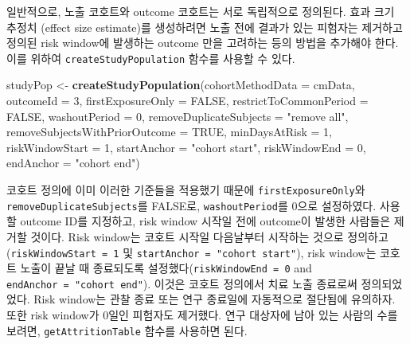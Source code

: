 \documentclass[11pt]{book}
\newenvironment{Shaded}{\begin{snugshade}}{\end{snugshade}}
\newcommand{\KeywordTok}[1]{\textcolor[rgb]{0.13,0.29,0.53}{\textbf{#1}}}
\newcommand{\DataTypeTok}[1]{\textcolor[rgb]{0.13,0.29,0.53}{#1}}
\newcommand{\DecValTok}[1]{\textcolor[rgb]{0.00,0.00,0.81}{#1}}
\newcommand{\StringTok}[1]{\textcolor[rgb]{0.31,0.60,0.02}{#1}}
\newcommand{\OtherTok}[1]{\textcolor[rgb]{0.56,0.35,0.01}{#1}}
\newcommand{\NormalTok}[1]{#1}
\theoremstyle{definition}
\theoremstyle{definition}
\theoremstyle{definition}
\theoremstyle{remark}
\begin{document}
일반적으로, 노출 코호트와 outcome 코호트는 서로 독립적으로 정의된다.
효과 크기 추정치 (effect size estimate)를 생성하려면 노출 전에 결과가
있는 피험자는 제거하고 정의된 risk window에 발생하는 outcome 만을
고려하는 등의 방법을 추가해야 한다. 이를 위하여
\texttt{createStudyPopulation} 함수를 사용할 수 있다.

\begin{Shaded}
\begin{Highlighting}[]
\NormalTok{studyPop <-}\StringTok{ }\KeywordTok{createStudyPopulation}\NormalTok{(}\DataTypeTok{cohortMethodData =}\NormalTok{ cmData,}
                                  \DataTypeTok{outcomeId =} \DecValTok{3}\NormalTok{,}
                                  \DataTypeTok{firstExposureOnly =} \OtherTok{FALSE}\NormalTok{,}
                                  \DataTypeTok{restrictToCommonPeriod =} \OtherTok{FALSE}\NormalTok{,}
                                  \DataTypeTok{washoutPeriod =} \DecValTok{0}\NormalTok{,}
                                  \DataTypeTok{removeDuplicateSubjects =} \StringTok{"remove all"}\NormalTok{,}
                                  \DataTypeTok{removeSubjectsWithPriorOutcome =} \OtherTok{TRUE}\NormalTok{,}
                                  \DataTypeTok{minDaysAtRisk =} \DecValTok{1}\NormalTok{,}
                                  \DataTypeTok{riskWindowStart =} \DecValTok{1}\NormalTok{,}
                                  \DataTypeTok{startAnchor =} \StringTok{"cohort start"}\NormalTok{,}
                                  \DataTypeTok{riskWindowEnd =} \DecValTok{0}\NormalTok{,}
                                  \DataTypeTok{endAnchor =} \StringTok{"cohort end"}\NormalTok{)}
\end{Highlighting}
\end{Shaded}

코호트 정의에 이미 이러한 기준들을 적용했기 때문에
\texttt{firstExposureOnly}와 \texttt{removeDuplicateSubjects}를 FALSE로,
\texttt{washoutPeriod}를 0으로 설정하였다. 사용할 outcome ID를 지정하고,
risk window 시작일 전에 outcome이 발생한 사람들은 제거할 것이다. Risk
window는 코호트 시작일 다음날부터 시작하는 것으로
정의하고(\texttt{riskWindowStart\ =\ 1} 및
\texttt{startAnchor\ =\ "cohort\ start"}), risk window는 코호트 노출이
끝날 때 종료되도록 설정했다(\texttt{riskWindowEnd\ =\ 0} and
\texttt{endAnchor\ =\ "cohort\ end"}). 이것은 코호트 정의에서 치료 노출
종료로써 정의되었었다. Risk window는 관찰 종료 또는 연구 종료일에
자동적으로 절단됨에 유의하자. 또한 risk window가 0일인 피험자도
제거했다. 연구 대상자에 남아 있는 사람의 수를 보려면,
\texttt{getAttritionTable} 함수를 사용하면 된다.
\end{document}
